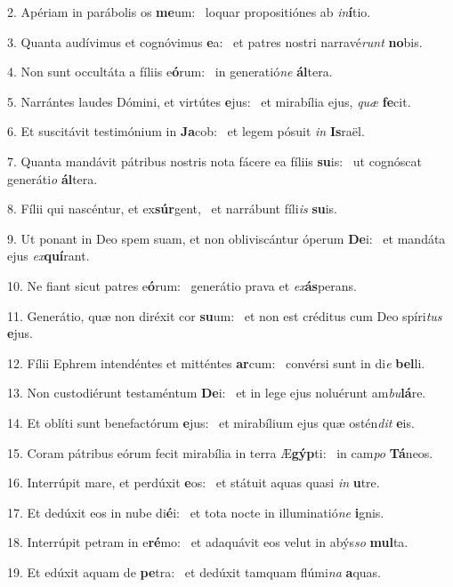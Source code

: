 2. Apériam in parábolis os \textbf{me}um: \ast\  loquar propositiónes ab \textit{in}\textbf{í}tio.\

3. Quanta audívimus et cognóvimus \textbf{e}a: \ast\  et patres nostri narravé\textit{runt} \textbf{no}bis.\

4. Non sunt occultáta a fíliis e\textbf{ó}rum: \ast\  in generatió\textit{ne} \textbf{ál}tera.\

5. Narrántes laudes Dómini, et virtútes \textbf{e}jus: \ast\  et mirabília ejus, \textit{quæ} \textbf{fe}cit.\

6. Et suscitávit testimónium in \textbf{Ja}cob: \ast\  et legem pósuit \textit{in} \textbf{Is}raël.\

7. Quanta mandávit pátribus nostris nota fácere ea fíliis \textbf{su}is: \ast\  ut cognóscat generáti\textit{o} \textbf{ál}tera.\

8. Fílii qui nascéntur, et ex\textbf{súr}gent, \ast\  et narrábunt fíli\textit{is} \textbf{su}is.\

9. Ut ponant in Deo spem suam, et non obliviscántur óperum \textbf{De}i: \ast\  et mandáta ejus \textit{ex}\textbf{quí}rant.\

10. Ne fiant sicut patres e\textbf{ó}rum: \ast\  generátio prava et \textit{ex}\textbf{ás}perans.\

11. Generátio, quæ non diréxit cor \textbf{su}um: \ast\  et non est créditus cum Deo spíri\textit{tus} \textbf{e}jus.\

12. Fílii Ephrem intendéntes et mitténtes \textbf{ar}cum: \ast\  convérsi sunt in di\textit{e} \textbf{bel}li.\

13. Non custodiérunt testaméntum \textbf{De}i: \ast\  et in lege ejus noluérunt am\textit{bu}\textbf{lá}re.\

14. Et oblíti sunt benefactórum \textbf{e}jus: \ast\  et mirabílium ejus quæ ostén\textit{dit} \textbf{e}is.\

15. Coram pátribus eórum fecit mirabília in terra Æ\textbf{gýp}ti: \ast\  in cam\textit{po} \textbf{Tá}neos.\

16. Interrúpit mare, et perdúxit \textbf{e}os: \ast\  et státuit aquas quasi \textit{in} \textbf{u}tre.\

17. Et dedúxit eos in nube di\textbf{é}i: \ast\  et tota nocte in illuminatió\textit{ne} \textbf{i}gnis.\

18. Interrúpit petram in e\textbf{ré}mo: \ast\  et adaquávit eos velut in abýs\textit{so} \textbf{mul}ta.\

19. Et edúxit aquam de \textbf{pe}tra: \ast\  et dedúxit tamquam flúmi\textit{na} \textbf{a}quas.\

